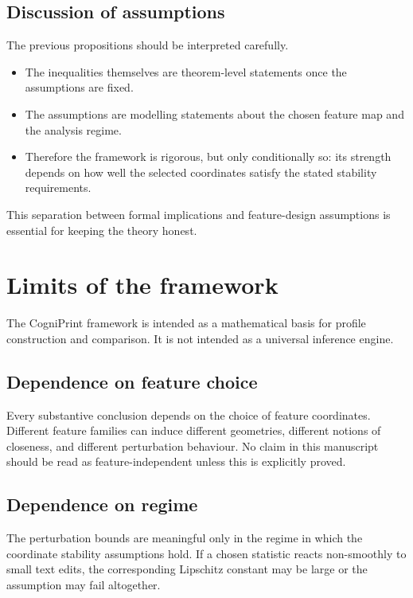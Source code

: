 \documentclass[11pt]{article}
\begin{document}
\subsection{Discussion of assumptions}

The previous propositions should be interpreted carefully.
\begin{itemize}
    \item The inequalities themselves are theorem-level statements once the assumptions are fixed.
    \item The assumptions are modelling statements about the chosen feature map and the analysis regime.
    \item Therefore the framework is rigorous, but only conditionally so: its strength depends on how well the selected coordinates satisfy the stated stability requirements.
\end{itemize}

This separation between formal implications and feature-design assumptions is essential for keeping the theory honest.

\section{Limits of the framework}

The CogniPrint framework is intended as a mathematical basis for profile construction and comparison. It is not intended as a universal inference engine.

\subsection{Dependence on feature choice}

Every substantive conclusion depends on the choice of feature coordinates. Different feature families can induce different geometries, different notions of closeness, and different perturbation behaviour. No claim in this manuscript should be read as feature-independent unless this is explicitly proved.

\subsection{Dependence on regime}

The perturbation bounds are meaningful only in the regime in which the coordinate stability assumptions hold. If a chosen statistic reacts non-smoothly to small text edits, the corresponding Lipschitz constant may be large or the assumption may fail altogether.
\end{document}
